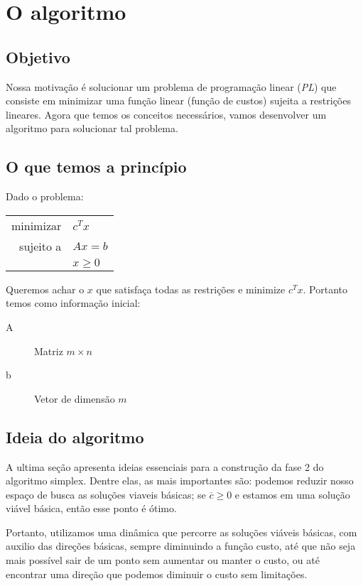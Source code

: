 \documentclass[12pt]{article}
\begin{document}
    
    
\section{O algoritmo}

\subsection{Objetivo}
	Nossa motivação é solucionar um problema de programação linear (\emph{PL}) que consiste em minimizar uma função linear (função de custos) sujeita a restrições lineares. Agora que temos os conceitos necessários, vamos desenvolver um algoritmo para solucionar tal problema.

\subsection{O que temos a princípio}
\label{fase2:args}
	Dado o problema:
    \begin{center}
    	\begin{tabular}{r l}
	  		minimizar & $c^Tx$ \\
        
        	sujeito a & $Ax = b$ \\
            & $x \geq 0$ \\
        \end{tabular}
    \end{center}
  
	Queremos achar o $x$ que satisfaça todas as restrições e minimize $c^Tx$. Portanto temos como informação inicial: 
	\begin{description}
		\item[A] Matriz $m \times n$
		\item[b] Vetor de dimensão $m$
	\end{description}

\subsection{Ideia do algoritmo}
	A ultima seção apresenta ideias essenciais para a construção da fase 2 do algoritmo simplex. Dentre elas, as mais importantes são: podemos reduzir nosso espaço de busca as soluções viaveis básicas; se $\overline{c} \geq 0$ e estamos em uma solução viável básica, então esse ponto é ótimo.
    
    Portanto, utilizamos uma dinâmica que percorre as soluções viáveis básicas, com auxilio das direções básicas, sempre diminuindo a função custo, até que não seja mais possível sair de um ponto sem aumentar ou manter o custo, ou até encontrar uma direção que podemos diminuir o custo sem limitações.
    
\end{document}
